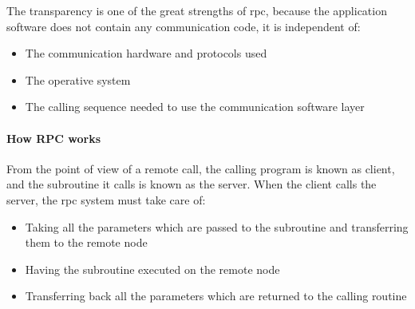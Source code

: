 \documentclass[a4paper, 12pt]{article} %
\begin{document}
            The transparency is one of the great strengths of \acrshort{rpc}, because the application software does not contain any communication code, it is independent of:
            \begin{itemize}
                \item The communication hardware and protocols used
                \item The operative system
                \item The calling sequence needed to use the communication software layer
            \end{itemize}
            
            \paragraph{How RPC works}
                From the point of view of a remote call, the calling program is known as client, and the subroutine it calls is known as the server\cite{rpcInOS}\cite{howRPC}. When the client calls the server, the \acrshort{rpc} system must take care of:
                \begin{itemize}
                    \item Taking all the parameters which are passed to the subroutine and transferring them to the remote node
                    \item Having the subroutine executed on the remote node
                    \item Transferring back all the parameters which are returned to the calling routine
                \end{itemize}
                
\end{document}
